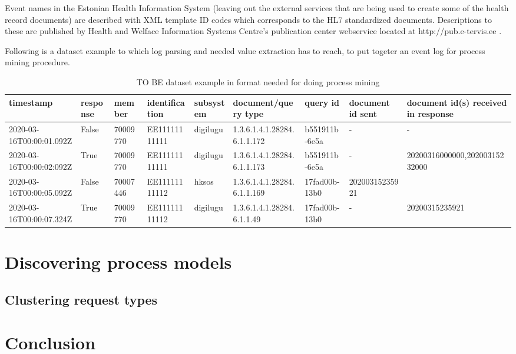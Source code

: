 \documentclass[a4paper, 12pt]{article}
\let\stdsection\section
\renewcommand\section{\newpage\stdsection}
\begin{document}
 Event names in the Estonian Health Information System (leaving out the external services that are being used to create some of the health record documents) are described with XML template ID codes which corresponds to the HL7 standardized documents. Descriptions to these are published by Health and Welface Information Systems Centre's publication center webservice located at http://pub.e-tervis.ee . 

Following is a dataset example to which log parsing and needed value extraction has to reach, to put togeter an event log for process mining procedure. 

\begin{landscape}

\begin{table}[]
	\centering
	\small
	\begin{tabular}{lllllllll}
		\hline
		timestamp &
		response &
		member &
		identification &
		subsystem &
		document/query type &
		query id &
		document id sent &
		document id(s) received in response \\ \hline
		2020-03-16T00:00:01.092Z & False & 70009770 & EE11111111111 & digilugu & 1.3.6.1.4.1.28284.6.1.1.172 & b551911b-6e5a & -              & -              \\
		2020-03-16T00:00:02:092Z &
		True &
		70009770 &
		EE11111111111 &
		digilugu &
		1.3.6.1.4.1.28284.6.1.1.173 &
		b551911b-6e5a &
		- &
		20200316000000,20200315232000 \\
		2020-03-16T00:00:05.092Z & False & 70007446 & EE11111111112 & hksos    & 1.3.6.1.4.1.28284.6.1.1.169 & 17fad00b-13b0 & 20200315235921 &                \\
		2020-03-16T00:00:07.324Z & True  & 70009770 & EE11111111112 & digilugu & 1.3.6.1.4.1.28284.6.1.1.49  & 17fad00b-13b0 & -               & 20200315235921 \\ \hline
	\end{tabular}

	\caption{TO BE dataset example in format needed for doing process mining}
	\label{tab:dataset example}
\end{table}
\end{landscape}


\section{Discovering process models}

\subsection{Clustering request types}


\section{Conclusion}
\label{Conclusion} 
\pagebreak


\footnotesize
{}
\end{document}
